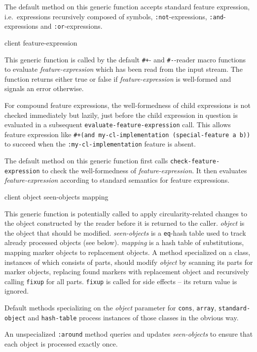 The default method on this generic function accepts standard
\commonlisp{} feature expression, i.e.\ expressions recursively
composed of symbols, \texttt{:not}-expressions,
\texttt{:and}-expressions and \texttt{:or}-expressions.

 {client feature-expression}

This generic function is called by the default \texttt{\#+}- and
\texttt{\#-}-reader macro functions to evaluate
\textit{feature-expression} which has been read from the input stream.
The function returns either true or false if
\textit{feature-expression} is well-formed and signals an error
otherwise.

For compound feature expressions, the well-formedness of child
expressions is not checked immediately but lazily, just before the
child expression in question is evaluated in a subsequent
\texttt{evaluate-feature-expression} call.  This allows feature
expression like \texttt{\#+(and my-cl-implementation (special-feature
  a b))} to succeed when the \texttt{:my-cl-implementation} feature is
absent.

The default method on this generic function first calls
\texttt{check-feature-expression} to check the well-formedness of
\textit{feature-expression}.  It then evaluates
\textit{feature-expression} according to standard \commonlisp{}
semantics for feature expressions.

 {client object seen-objects mapping}

This generic function is potentially called to apply
circularity-related changes to the object constructed by the reader
before it is returned to the caller.  \textit{object} is the object
that should be modified.  \textit{seen-objects} is a \texttt{eq}-hash
table used to track already processed objects (see below).
\textit{mapping} is a hash table of substitutions, mapping marker
objects to replacement objects.  A method specialized on a class,
instances of which consists of parts, should modify \textit{object} by
scanning its parts for marker objects, replacing found markers with
replacement object and recursively calling \texttt{fixup} for all
parts.  \texttt{fixup} is called for side effects -- its return value
is ignored.

Default methods specializing on the \textit{object} parameter for
\texttt{cons}, \texttt{array}, \texttt{standard-object} and
\texttt{hash-table} process instances of those classes in the obvious
way.

An unspecialized \texttt{:around} method queries and updates
\textit{seen-objects} to ensure that each object is processed exactly
once.

